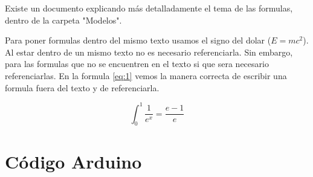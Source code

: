 Existe un documento explicando más detalladamente el tema de las formulas, dentro de la carpeta "Modelos".

Para poner formulas dentro del mismo texto usamos el signo del dolar ($E=mc^2$). Al estar dentro de un mismo texto no es necesario referenciarla. Sin embargo, para las formulas que no se encuentren en el texto si que sera necesario referenciarlas. En la formula \ref{eq:1} vemos la manera correcta de escribir una formula fuera del texto y de referenciarla.

\begin{equation}
    \label{eq:1}
    \int_0^1 \frac{1}{e^x} =  \frac{e-1}{e}
\end{equation}

\section{Código Arduino}
